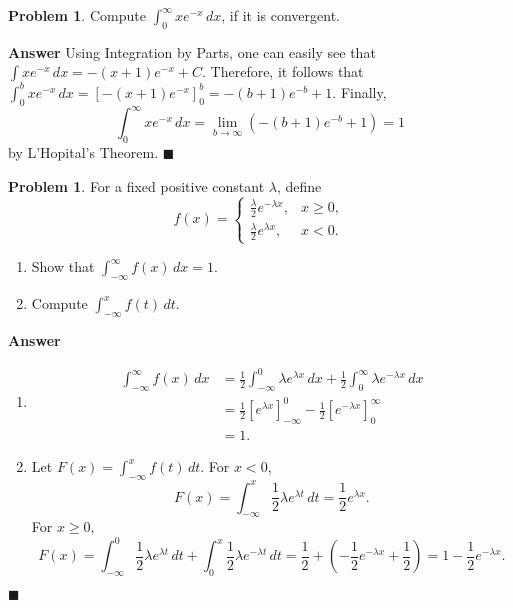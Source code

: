 \documentclass[12pt,letterpaper]{book}
\numberwithin{equation}{section}
\theoremstyle{definition}
\newtheorem{problem}[thm]{\textbf{Problem}}
\newenvironment{answer}{\noindent\textbf{Answer}}{\hfill$\blacksquare$\vspace{0.1in}}
\begin{document}
\begin{problem} Compute $\displaystyle{\int_0^\infty xe^{-x}\,dx}$, if it is convergent.
\end{problem}

\begin{answer}
Using Integration by Parts, one can easily see that $\displaystyle{\int xe^{-x}\,dx}=-(x+1)e^{-x}+C$. Therefore, it follows that $\displaystyle{\int_0^b xe^{-x}\,dx=\left[-(x+1)e^{-x}\right]_0^b=-(b+1)e^{-b}+1}$. Finally,
$$\int_0^\infty xe^{-x}\,dx=\lim_{b\to \infty} (-(b+1)e^{-b}+1)=1$$ by L'Hopital's Theorem.
\end{answer}

\begin{problem}
For a fixed positive constant $\lambda$, define
$$f(x)=\begin{cases} \frac{\lambda}{2}e^{-\lambda x}, &x\geq 0, \\ \frac{\lambda}{2}e^{\lambda x}, &x<0.\end{cases}$$
\begin{enumerate}
\item Show that $\displaystyle{\int_{-\infty}^\infty f(x)\,dx=1}$.
\item Compute $\displaystyle{\int_{-\infty}^x f(t)\,dt}$.
\end{enumerate}
\end{problem}

\begin{answer}
\begin{enumerate}
\item
\begin{align*}
\int_{-\infty}^{\infty} f(x)\,dx&=\frac{1}{2}\int_{-\infty}^0 \lambda e^{\lambda x}\,dx+\frac{1}{2}\int_0^{\infty} \lambda e^{-\lambda x}\,dx \\
&=\frac{1}{2} \left[e^{\lambda x}\right]_{-\infty}^{0}-\frac{1}{2} \left[e^{-\lambda x}\right]_0^{\infty} \\
&=1.
\end{align*}
\item Let $F(x)=\displaystyle{\int_{-\infty}^x f(t)\,dt}$. For $x<0$, $$F(x)=\int_{-\infty}^x \frac{1}{2}\lambda e^{\lambda t}\,dt=\frac{1}{2}e^{\lambda x}.$$ For $x\geq 0$,
$$F(x)=\int_{-\infty}^0 \frac{1}{2}\lambda e^{\lambda t}\,dt+\int_0^{x} \frac{1}{2} \lambda e^{-\lambda t}\,dt=\frac{1}{2}+\left(-\frac{1}{2}e^{-\lambda x}+\frac{1}{2}\right)=1-\frac{1}{2}e^{-\lambda x}.$$
\end{enumerate}
\end{answer}
\end{document}
